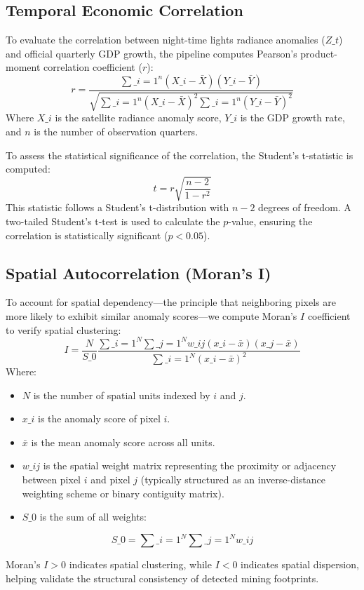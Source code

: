 \subsection{Temporal Economic Correlation}
To evaluate the correlation between night-time lights radiance anomalies ($Z\_t$) and official quarterly GDP growth, the pipeline computes Pearson's product-moment correlation coefficient ($r$):
$$r = \frac{\sum\_{i=1}^n (X\_i - \bar{X})(Y\_i - \bar{Y})}{\sqrt{\sum\_{i=1}^n (X\_i - \bar{X})^2 \sum\_{i=1}^n (Y\_i - \bar{Y})^2}}$$
Where $X\_i$ is the satellite radiance anomaly score, $Y\_i$ is the GDP growth rate, and $n$ is the number of observation quarters.

To assess the statistical significance of the correlation, the Student's t-statistic is computed:
$$t = r\sqrt{\frac{n-2}{1-r^2}}$$
This statistic follows a Student's t-distribution with $n-2$ degrees of freedom. A two-tailed Student's t-test is used to calculate the $p$-value, ensuring the correlation is statistically significant ($p < 0.05$).

\subsection{Spatial Autocorrelation (Moran's I)}
To account for spatial dependency—the principle that neighboring pixels are more likely to exhibit similar anomaly scores—we compute Moran's $I$ coefficient to verify spatial clustering:
$$I = \frac{N}{S\_0} \frac{\sum\_{i=1}^N \sum\_{j=1}^N w\_{ij}(x\_i - \bar{x})(x\_j - \bar{x})}{\sum\_{i=1}^N (x\_i - \bar{x})^2}$$
Where:
\begin{itemize}
  \item $N$ is the number of spatial units indexed by $i$ and $j$.
  \item $x\_i$ is the anomaly score of pixel $i$.
  \item $\bar{x}$ is the mean anomaly score across all units.
  \item $w\_{ij}$ is the spatial weight matrix representing the proximity or adjacency between pixel $i$ and pixel $j$ (typically structured as an inverse-distance weighting scheme or binary contiguity matrix).
  \item $S\_0$ is the sum of all weights:
\end{itemize}
$$S\_0 = \sum\_{i=1}^N \sum\_{j=1}^N w\_{ij}$$

Moran's $I > 0$ indicates spatial clustering, while $I < 0$ indicates spatial dispersion, helping validate the structural consistency of detected mining footprints.

